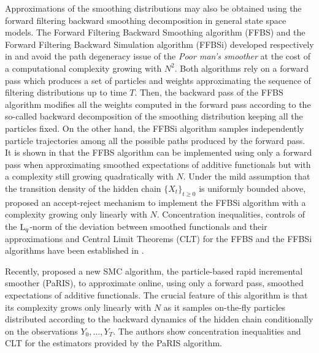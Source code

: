 Approximations of the smoothing distributions may also be obtained using the forward filtering backward smoothing decomposition in general state space models.  The Forward Filtering Backward Smoothing algorithm (FFBS) and  the Forward Filtering Backward Simulation algorithm (FFBSi) developed respectively in \cite{kitagawa:1996,huerzeler:kunsch:1998,doucet:godsill:andrieu:2000} and \cite{godsill:doucet:west:2004} avoid the path degeneracy issue of the {\em Poor man's smoother} at the cost of a computational complexity growing with $N^2$. Both algorithms rely on a forward pass which produces a set of particles and weights approximating the sequence of filtering distributions up to time $T$. Then, the backward pass of the FFBS algorithm modifies all the weights computed in the forward pass according to the so-called  backward decomposition of the smoothing distribution keeping all the particles fixed. On the other hand, the FFBSi  algorithm samples independently particle trajectories among all the possible paths produced by the forward pass. It is  shown in \cite{mongillo:deneve:2008,cappe:2011,delmoral:doucet:singh:2010} that the FFBS algorithm can be implemented using only a forward pass when approximating smoothed expectations of additive functionals but with a complexity still growing quadratically with $N$.  Under the mild assumption that the transition density of the hidden chain $\{X_{t}\}_{t\geq 0}$ is uniformly bounded above, \cite{douc:garivier:moulines:olsson:2011} proposed an accept-reject mechanism to implement the FFBSi algorithm with a complexity growing only linearly with $N$. Concentration inequalities,  controls of the $\mathrm{L}_{q}$-norm of the deviation between smoothed functionals and their approximations and Central Limit Theorems (CLT) for the FFBS and the FFBSi algorithms have been established in \cite{delmoral:doucet:singh:2010,douc:garivier:moulines:olsson:2011,dubarry:lecorff:2013}.

Recently, \cite{olsson:westerborn:2015} proposed a new SMC algorithm, the particle-based rapid incremental smoother (PaRIS), to approximate online, using only a forward pass, smoothed expectations of additive functionals. The crucial feature of this algorithm is that its complexity grows only linearly with $N$ as it samples on-the-fly particles distributed according to the backward dynamics of the hidden chain conditionally on the observations $Y_0,\ldots,Y_T$.  The authors show concentration inequalities and CLT for the estimators provided by the PaRIS algorithm.


